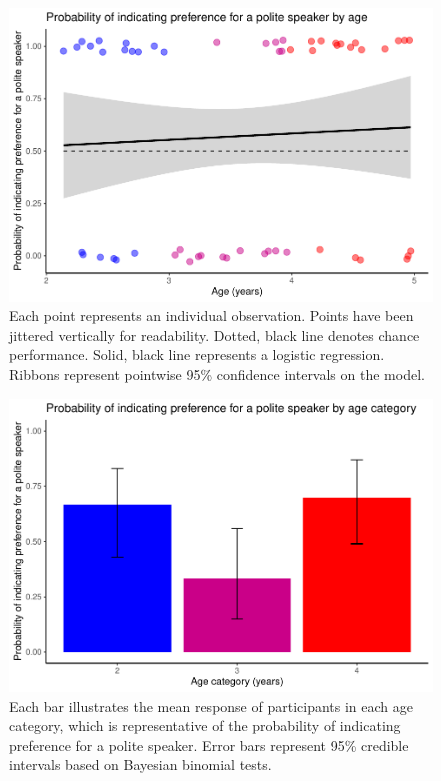 \documentclass[
  english,
  man,floatsintext]{apa6}
\begin{document}
\begin{figure}
\centering
\includegraphics{writeup_files/figure-latex/unnamed-chunk-1-1.pdf}
\caption{\label{fig:unnamed-chunk-1}Each point represents an individual observation. Points have been jittered vertically for readability. Dotted, black line denotes chance performance. Solid, black line represents a logistic regression. Ribbons represent pointwise 95\% confidence intervals on the model.}
\end{figure}

\newpage

\begin{figure}
\centering
\includegraphics{writeup_files/figure-latex/unnamed-chunk-2-1.pdf}
\caption{\label{fig:unnamed-chunk-2}Each bar illustrates the mean response of participants in each age category, which is representative of the probability of indicating preference for a polite speaker. Error bars represent 95\% credible intervals based on Bayesian binomial tests.}
\end{figure}
\end{document}
